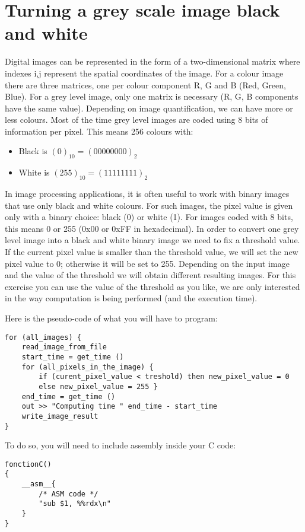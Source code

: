 \documentclass[10pt,a4paper]{article}
\theoremstyle{definition}%
\begin{document}
\section*{Turning a grey scale image black and white}
Digital images can be represented in the form of a two-dimensional matrix where indexes i,j represent the spatial coordinates of the image.
For a colour image there are three matrices, one per colour component R, G and B (Red, Green, Blue).
For a grey level image, only one matrix is necessary (R, G, B components have the same value).
Depending on image quantification, we can have more or less colours.
Most of the time grey level images are coded using 8 bits of information per pixel.
This means 256 colours with:
\begin{itemize}
	\item Black is $(0)_{10} = (00000000)_2$
	\item White is $(255)_{10} = (11111111)_2$
\end{itemize}

In image processing applications, it is often useful to work with binary images that use only black and white colours.
For such images, the pixel value is given only with a binary choice: black (0) or white (1).
For images coded with 8 bits, this means 0 or 255 (0x00 or 0xFF in hexadecimal).
In order to convert one grey level image into a black and white binary image we need to fix a threshold value.
If the current pixel value is smaller than the threshold value, we will set the new pixel value to 0; otherwise it will be set to 255.
Depending on the input image and the value of the threshold we will obtain different resulting images.
For this exercise you can use the value of the threshold as you like, we are only interested in the way computation is being performed (and the execution time).

Here is the pseudo-code of what you will have to program:
\begin{verbatim}
for (all_images) {
	read_image_from_file
	start_time = get_time ()
	for (all_pixels_in_the_image) {
		if (curent_pixel_value < treshold) then new_pixel_value = 0
		else new_pixel_value = 255 }
	end_time = get_time ()
	out >> "Computing time " end_time - start_time
	write_image_result
}
\end{verbatim}

To do so, you will need to include assembly inside your C code:

\begin{verbatim}
fonctionC()
{
	__asm__{
		/* ASM code */
		"sub $1, %%rdx\n"
	}
}
\end{verbatim}
\end{document}
